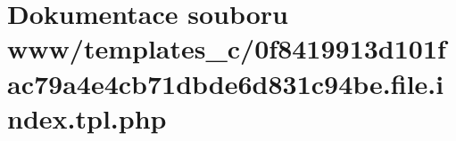 \section{Dokumentace souboru www/templates\_\-c/0f8419913d101fac79a4e4cb71dbde6d831c94be.file.index.tpl.php}
\label{d6/d1a/0f8419913d101fac79a4e4cb71dbde6d831c94be_8file_8index_8tpl_8php}
